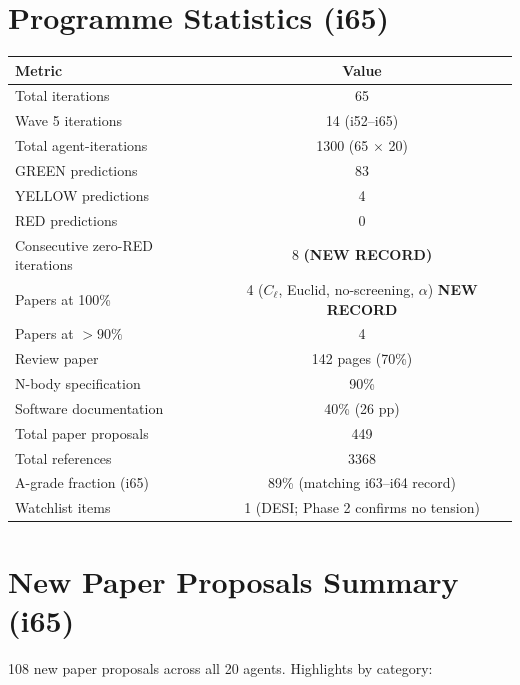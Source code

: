 \documentclass[11pt,a4paper]{article}
\begin{document}
\section{Programme Statistics (i65)}
\label{sec:stats}

\begin{center}
\begin{tabular}{lc}
\toprule
\textbf{Metric} & \textbf{Value} \\
\midrule
Total iterations & 65 \\
Wave 5 iterations & 14 (i52--i65) \\
Total agent-iterations & 1300 (65 $\times$ 20) \\
GREEN predictions & 83 \\
YELLOW predictions & 4 \\
RED predictions & 0 \\
Consecutive zero-RED iterations & 8 \textbf{(NEW RECORD)} \\
Papers at 100\% & 4 ($C_\ell$, Euclid, no-screening, $\alpha$) \textbf{NEW RECORD} \\
Papers at $> 90\%$ & 4 \\
Review paper & 142 pages (70\%) \\
N-body specification & 90\% \\
Software documentation & 40\% (26 pp) \\
Total paper proposals & 449 \\
Total references & 3368 \\
A-grade fraction (i65) & 89\% (matching i63--i64 record) \\
Watchlist items & 1 (DESI; Phase 2 confirms no tension) \\
\bottomrule
\end{tabular}
\end{center}


\section{New Paper Proposals Summary (i65)}
\label{sec:papers}

108 new paper proposals across all 20 agents. Highlights by category:
\end{document}
